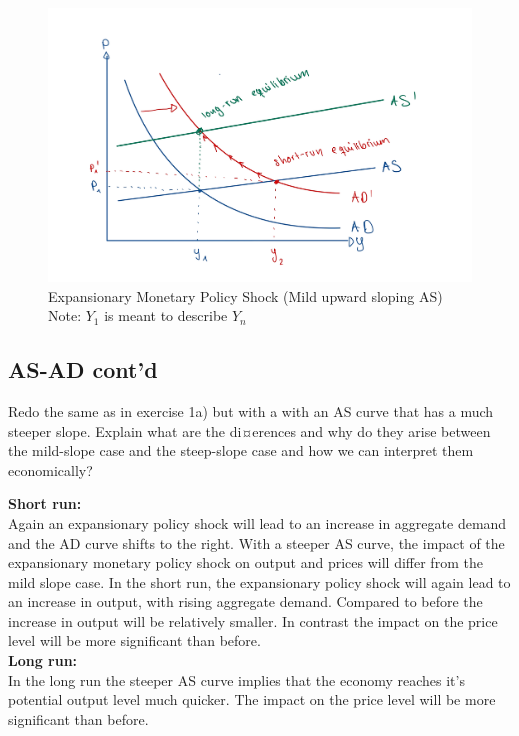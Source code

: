 \documentclass[a4paper,11pt]{article}
\begin{document}
\begin{figure}[H]
\centering
\includegraphics[scale=0.2]{figures/ASAD_mildslope.png}
\caption{Expansionary Monetary Policy Shock (Mild upward sloping AS) Note: $Y_1$ is meant to describe $Y_n$}
\end{figure}

\pagebreak

\begin{qbox}{\subsection{AS-AD cont'd}}
Redo the same as in exercise 1a) but with a with an AS curve that has a much steeper slope. Explain what are the di¤erences and why do they arise between the mild-slope case and the steep-slope case and how we can interpret them economically?
\end{qbox}

\textbf{Short run:}\\

Again an expansionary policy shock will lead to an increase in aggregate demand and the AD curve shifts to the right. With a steeper AS curve, the impact of the expansionary monetary policy shock on output and prices will differ from the mild slope case. In the short run, the expansionary policy shock will again lead to an increase in output, with rising aggregate demand. Compared to before the increase in output will be relatively smaller. In contrast the impact on the price level will be more significant than before. \\

\textbf{Long run:}\\

In the long run the steeper AS curve implies that the economy reaches it's potential output level much quicker. The impact on the price level will be more significant than before. \\
\end{document}

